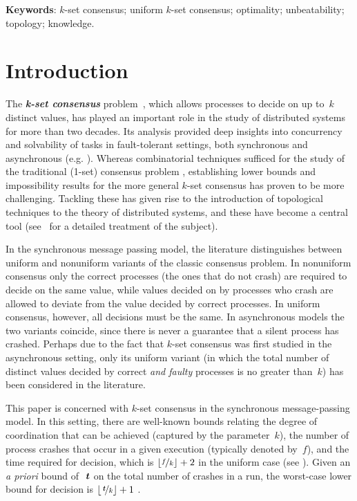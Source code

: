 \documentclass[11pt]{article}
\theoremstyle{definition}
\newcommand{\defemph}[1]{\textbf{\textit{#1}}}
\newcommand{\tee}{\,\defemph{t}}
\begin{document}
\noindent
\textbf{Keywords}:
$k$-set consensus; uniform $k$-set consensus; optimality; unbeatability; topology; knowledge.

\section{Introduction}

The \defemph{k-set consensus} problem~\cite{Chaudhuri90}, which allows processes to decide on up to~$k$ distinct values,
has played an important role in the study of distributed systems for more than two decades.
Its analysis provided deep insights into concurrency and solvability of tasks in fault-tolerant settings, both synchronous and asynchronous
(e.g. \cite{AGGT, BorowskyG93,CHLT, GGP,GHP, Herlihy:1999, SaksZ00}).
Whereas combinatorial techniques sufficed for the study of the traditional (1-set) consensus problem \cite{FLP},  establishing lower bounds and impossibility results for the more general
$k$-set consensus has proven to be more challenging. Tackling these has given rise to the introduction of topological techniques to the theory of distributed systems, and these have become a central tool (see~\cite{Herlihy2013} for a detailed treatment of the subject).

In the synchronous message passing model, the literature distinguishes between uniform and  nonuniform variants of the classic consensus problem.  In nonuniform consensus only the correct processes (the ones that do not crash) are required to decide on the same value, while values decided on by processes who crash are allowed to deviate from the
value decided by
correct processes. In uniform consensus, however, all decisions must be the same. In asynchronous models the two variants coincide, since there is never a guarantee that a silent process has crashed.
Perhaps due to the fact that $k$-set consensus was first studied in the asynchronous setting, only its uniform variant (in which the total number of distinct values decided by correct \emph{and faulty} processes is no greater than~$k$) has been considered in the literature.

This paper is concerned with $k$-set consensus in the synchronous message-passing model. In this setting, there are well-known bounds relating the degree of coordination that can be achieved (captured by the parameter~$k$), the number of process crashes that occur
in a given execution (typically denoted by~$f$), and the time required for decision, which is
$\lfloor \nicefrac{f}{k} \rfloor+2$ in the uniform case (see \cite{AGGT,GGP,GHP}).
Given an {\it a priori} bound of~$\tee$ on the total number of crashes in a run, the worst-case lower bound for decision is $\lfloor \nicefrac{\tee}{k} \rfloor+1$
\cite{CHLT}.
\end{document}
